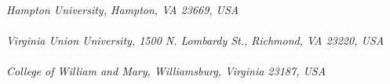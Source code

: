 \begin{titlepage}
\begin{center}
       \vspace*{0.6cm}
        \\
       \vspace*{0.2cm}
       \noindent \emph{Hampton University, Hampton, VA 23669, USA} \\

       \vspace*{0.6cm}
        \\
       \vspace*{0.2cm}
       \noindent \emph{Virginia Union University, 1500 N. Lombardy St., 
        Richmond, VA 23220, USA} \\
 
       \vspace*{0.6cm}
        \\
       \vspace*{0.2cm}
       \noindent \emph{College of William and Mary, Williamsburg, Virginia 23187, USA} \\
        
        
        
        \vspace*{0.7cm}
        \\
      \end{center}
\renewcommand*{\thefootnote}{\arabic{footnote}}

\date{\today}
     

\end{titlepage}
\sloppy

\titlepage

